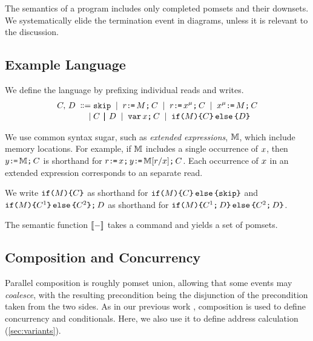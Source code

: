 The semantics of a program includes only completed pomsets and their
downsets.  We systematically elide the termination event in diagrams, unless
it is relevant to the discussion.

\subsection{Example Language}
We define the language by prefixing individual reads and writes.  %
\begin{align*}
  \aCmd,\,\bCmd
  \BNFDEF& \SKIP
  \BNFSEP \aReg\GETS\aExp\SEMI \aCmd
  \BNFSEP \aReg\GETS\aLoc^{\amode}\SEMI \aCmd 
  \BNFSEP \aLoc^{\amode}\GETS\aExp\SEMI \aCmd
  \\[-.5ex]
  \BNFSEP&\aCmd \PAR[\aThrd][\bThrd] \bCmd
  \BNFSEP \VAR\aLoc\SEMI \aCmd
  \BNFSEP \IF{\aExp} \THEN \aCmd \ELSE \bCmd \FI
\end{align*}

We use common syntax sugar, such as \emph{extended expressions}, $\aEExp$,
which include memory locations.  For example, if $\aEExp$ includes a single
occurrence of $\aLoc$, then $\bLoc\GETS\aEExp\SEMI \aCmd$ is shorthand for
$\aReg\GETS\aLoc\SEMI\bLoc\GETS\aEExp[\aReg/\aLoc]\SEMI \aCmd$.  Each
occurrence of $\aLoc$ in an extended expression corresponds to an separate
read.

We write
$\IF{\aExp} \THEN \aCmd \FI$ as shorthand for
$\IF{\aExp} \THEN \aCmd\ELSE \SKIP\FI$ and
$\IF{\aExp} \THEN \aCmd^1 \ELSE \aCmd^2 \FI \SEMI \bCmd$ as shorthand for
$\IF{\aExp} \THEN \aCmd^1 \SEMI \bCmd\ELSE \aCmd^2 \SEMI \bCmd\FI$.

The semantic function $\sem[\aThrd]{-}$ takes a command and
yields a set of pomsets.

\subsection{Composition and Concurrency}
\label{sec:par}
Parallel composition is roughly pomset union, allowing that some events may
\emph{coalesce}, with the resulting precondition being the disjunction of the
precondition taken from the two sides.  As in our previous work
\cite{2019-sp}, composition is used to define concurrency and conditionals.
Here, we also use it to define address calculation
(\textsection\ref{sec:variants}).  %

